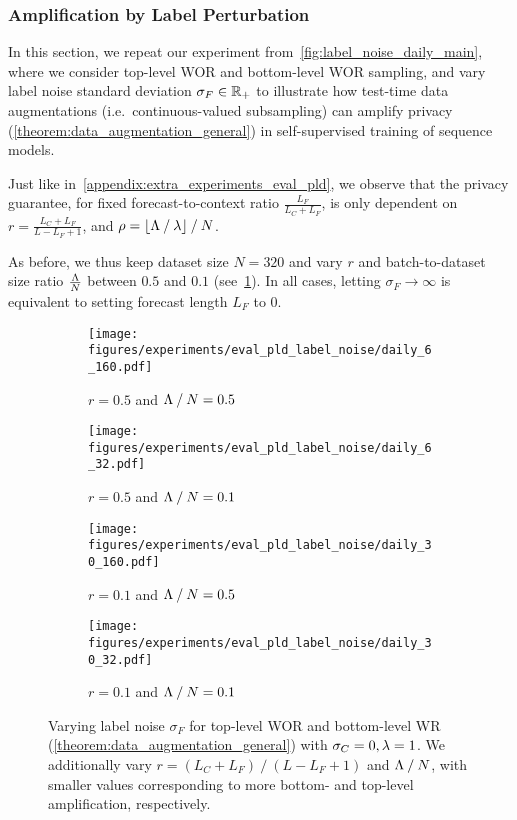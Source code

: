 \clearpage

\subsubsection{Amplification by Label Perturbation}
In this section, we repeat our experiment from~\cref{fig:label_noise_daily_main},
where we consider top-level WOR and bottom-level WOR sampling, and
vary label noise standard deviation $\sigma_F \in {\mathbb{R}}_+$ to illustrate how test-time data augmentations (i.e.\ continuous-valued subsampling) can amplify privacy (\cref{theorem:data_augmentation_general}) in self-supervised training of sequence models.

Just like in~\cref{appendix:extra_experiments_eval_pld},
we observe that the privacy guarantee, for fixed forecast-to-context ratio $\frac{L_F}{L_C + L_F}$, is only dependent 
on 
$r = \frac{L_C + L_F}{L - L_F + 1}$,
 and 
$\rho = \lfloor \Lambda \mathbin{/} \lambda \rfloor \mathbin{/} N$.

As before, we thus keep dataset size $N=320$ and vary
$r$ and batch-to-dataset size ratio $\frac{\Lambda}{N}$ between $0.5$ and $0.1$ (see~\cref{fig:label_noise_daily_appendix}).
In all cases, letting $\sigma_F \to \infty$ is equivalent to setting forecast length $L_F$ to $0$. 

\begin{figure*}[ht!]
\centering
\vskip 0.2in
    \begin{subfigure}{0.49\textwidth}
        \texttt{[image: figures/experiments/eval\_pld\_label\_noise/daily\_6\_160.pdf]}
        \caption{$r = 0.5$ and $\Lambda \mathbin{/} N = 0.5$}
    \end{subfigure}
    \hfill
    \begin{subfigure}{0.49\textwidth}
        \texttt{[image: figures/experiments/eval\_pld\_label\_noise/daily\_6\_32.pdf]}
        \caption{$r = 0.5$ and $\Lambda \mathbin{/} N = 0.1$}
    \end{subfigure}
    \begin{subfigure}{0.49\textwidth}
        \texttt{[image: figures/experiments/eval\_pld\_label\_noise/daily\_30\_160.pdf]}
        \caption{$r = 0.1$ and $\Lambda \mathbin{/} N = 0.5$}
    \end{subfigure}
    \hfill
    \begin{subfigure}{0.49\textwidth}
        \texttt{[image: figures/experiments/eval\_pld\_label\_noise/daily\_30\_32.pdf]}
        \caption{$r = 0.1$ and $\Lambda \mathbin{/} N = 0.1$}
    \end{subfigure}
    \caption{Varying label noise $\sigma_F$ for top-level WOR and bottom-level WR  (\cref{theorem:data_augmentation_general}) with $\sigma_C = 0, \lambda=1$.
    We additionally vary $r = (L_C + L_F) \mathbin{/} (L - L_F + 1)$
        and $\Lambda \mathbin{/} N$,
        with smaller values corresponding to more bottom- and top-level amplification, respectively.
    }
    \label{fig:label_noise_daily_appendix}
\vskip -0.2in
\end{figure*}

